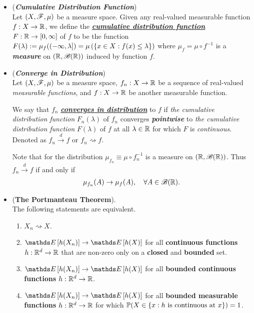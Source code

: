 \documentclass[11pt]{article}
\begin{document}
\begin{itemize}
\item \begin{definition} (\emph{\textbf{Cumulative Distribution Function}}) \citep{billingsley2008probability} \\
Let $(X,{\mathscr F}, \mu)$ be a measure space. Given any real-valued measurable function $f : X \rightarrow {\mathbb R}$, we define the \underline{\emph{\textbf{cumulative distribution function}}} $F : {\mathbb R} \rightarrow [0, \infty]$ of $f$ to be the function $F(\lambda) := \mu_{f}((-\infty, \lambda])= \mu\left(\left\{x \in  X : f(x) \le \lambda\right\}\right)$ where  $\mu_f = \mu\circ f^{-1}$ is a \emph{\textbf{measure}} on $({\mathbb R}, {\mathscr B}({\mathbb R}))$ induced by function $f$.  
\end{definition}

\item \begin{definition}  (\emph{\textbf{Converge in Distribution}}) \citep{van2000asymptotic}\\
Let $(X,{\mathscr F}, \mu)$ be a measure space, $f_n : X \rightarrow {\mathbb R}$ be a sequence of real-valued \emph{measurable functions}, and $f: X \rightarrow {\mathbb R}$ be another measurable function. 

We say that $f_n$ \underline{\emph{\textbf{converges in distribution}}} to $f$ if \emph{the cumulative distribution function} $F_n(\lambda)$ of $f_n$
converges \emph{\textbf{pointwise}} to \emph{the cumulative distribution function} $F(\lambda)$ of $f$ at all $\lambda \in  {\mathbb R}$ for which $F$ is \emph{continuous}. Denoted as \underline{$f_{n}\stackrel{d}{\rightarrow} f$} or \underline{$f_n \rightsquigarrow f$}. 

Note that for the distribution $\mu_{f_n}\equiv \mu \circ f_{n}^{-1}$ is a measure on $({\mathbb R}, {\mathscr B}({\mathbb R}))$. Thus $f_{n}\stackrel{d}{\rightarrow} f$ if and only if 
\begin{align*}
\mu_{f_n}(A)  \rightarrow \mu_f(A), \quad \forall A \in {\mathscr B}({\mathbb R}).
\end{align*} 
\end{definition}

\item  \begin{theorem} (\textbf{The Portmanteau Theorem}).  \citep{van2000asymptotic}\\
 The following statements are equivalent.
 \begin{enumerate}
 \item $X_n \rightsquigarrow X$.
 \item $\E{}{h(X_n)} \rightarrow \E{}{h(X)}$ for all \textbf{continuous functions} $h: {\mathbb R}^d \rightarrow {\mathbb R}$ that are non-zero only on a \textbf{closed} and \textbf{bounded} set.
 \item $\E{}{h(X_n)} \rightarrow \E{}{h(X)}$ for all \textbf{bounded continuous functions} $h: {\mathbb R}^d \rightarrow {\mathbb R}$.
 \item $\E{}{h(X_n)} \rightarrow \E{}{h(X)}$ for all \textbf{bounded measurable functions} $h: {\mathbb R}^d \rightarrow {\mathbb R}$ for which ${\mathbb P}(X \in \{x: h\text{ is continuous at }x\})=1$.
 \end{enumerate}
\end{theorem}


\end{itemize}
\end{document}

